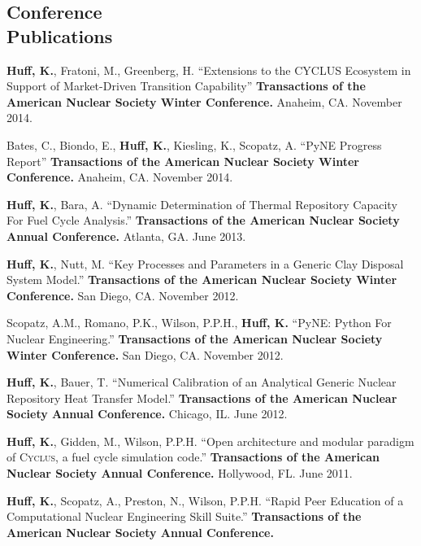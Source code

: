 \documentclass[margin,line]{resume}
\newcommand{\Cyclus}{\textsc{Cyclus}\xspace}%
\begin{document}
\begin{resume}
    \section{\mysidestyle Conference\\Publications}
    \begin{bibenum}
      \item \textbf{Huff, K.}, Fratoni, M., Greenberg, H. ``Extensions to the CYCLUS Ecosystem in Support of Market-Driven Transition Capability''
         \textbf{Transactions of the American Nuclear Society Winter Conference.}
         Anaheim, CA. November 2014.
      \item Bates, C., Biondo, E., \textbf{Huff, K.}, Kiesling, K., Scopatz, A. ``PyNE Progress Report''
         \textbf{Transactions of the American Nuclear Society Winter Conference.}
         Anaheim, CA. November 2014.
      \item \textbf{Huff, K.}, Bara, A. ``Dynamic Determination of Thermal Repository Capacity For Fuel Cycle Analysis.''
         \textbf{Transactions of the American Nuclear Society Annual Conference.}
         Atlanta, GA. June 2013.
      \item \textbf{Huff, K.}, Nutt, M. ``Key Processes and Parameters in a Generic Clay Disposal System Model.''
         \textbf{Transactions of the American Nuclear Society Winter Conference.}
        San Diego, CA. November 2012.
      \item Scopatz, A.M., Romano, P.K., Wilson, P.P.H., \textbf{Huff, K.} ``PyNE: Python For Nuclear Engineering.''
         \textbf{Transactions of the American Nuclear Society Winter Conference.}
        San Diego, CA. November 2012.
      \item \textbf{Huff, K.}, Bauer, T. ``Numerical Calibration of an Analytical Generic Nuclear Repository Heat Transfer Model.''
         \textbf{Transactions of the American Nuclear Society Annual Conference.}
        Chicago, IL. June 2012.
      \item \textbf{Huff, K.}, Gidden, M., Wilson, P.P.H. ``Open architecture and modular paradigm of \Cyclus, a fuel cycle simulation code.''
         \textbf{Transactions of the American Nuclear Society Annual Conference.}
        Hollywood, FL. June 2011.
      \item \textbf{Huff, K.}, Scopatz, A., Preston, N., Wilson, P.P.H. ``Rapid Peer Education of a Computational Nuclear Engineering Skill Suite.''
         \textbf{Transactions of the American Nuclear Society Annual Conference.}

\end{bibenum}
\end{resume}
\end{document}
